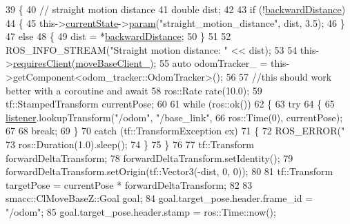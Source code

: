 \begin{DoxyCode}
39     \{
40         \textcolor{comment}{// straight motion distance}
41         \textcolor{keywordtype}{double} dist;
42 
43         \textcolor{keywordflow}{if} (!\hyperlink{classsm__dance__bot_1_1CbNavigateBackwards_ad5b1a7d85676aefa31f966baf61b6378}{backwardDistance})
44         \{
45             this->\hyperlink{classsmacc_1_1SmaccClientBehavior_af76fc9b877542ed5caf033f820c107d0}{currentState}->\hyperlink{classsmacc_1_1ISmaccState_a4982f2187ed6da337462721146e8ef70}{param}(\textcolor{stringliteral}{"straight\_motion\_distance"}, dist, 3.5);
46         \}
47         \textcolor{keywordflow}{else}
48         \{
49             dist = *\hyperlink{classsm__dance__bot_1_1CbNavigateBackwards_ad5b1a7d85676aefa31f966baf61b6378}{backwardDistance};
50         \}
51 
52         ROS\_INFO\_STREAM(\textcolor{stringliteral}{"Straight motion distance: "} << dist);
53 
54         this->\hyperlink{classsmacc_1_1SmaccClientBehavior_a917f001e763a1059af337bf4e164f542}{requiresClient}(\hyperlink{classsm__dance__bot_1_1CbNavigateBackwards_a8dea4225f55f14bf0a941baae383b07f}{moveBaseClient\_});
55         \textcolor{keyword}{auto} odomTracker\_ = this->getComponent<odom\_tracker::OdomTracker>();
56         
57         \textcolor{comment}{//this should work better with a coroutine and await}
58         ros::Rate rate(10.0);
59         tf::StampedTransform currentPose;
60 
61         \textcolor{keywordflow}{while} (ros::ok())
62         \{
63             \textcolor{keywordflow}{try}
64             \{
65                 \hyperlink{classsm__dance__bot_1_1CbNavigateBackwards_a4ec9af0d5b94c5e0654a768c36bec85b}{listener}.lookupTransform(\textcolor{stringliteral}{"/odom"}, \textcolor{stringliteral}{"/base\_link"},
66                                          ros::Time(0), currentPose);
67 
68                 \textcolor{keywordflow}{break};
69             \}
70             \textcolor{keywordflow}{catch} (tf::TransformException ex)
71             \{
72                 ROS\_ERROR(\textcolor{stringliteral}{"%
73                 ros::Duration(1.0).sleep();
74             \}
75         \}
76 
77         tf::Transform forwardDeltaTransform;
78         forwardDeltaTransform.setIdentity();
79         forwardDeltaTransform.setOrigin(tf::Vector3(-dist, 0, 0));
80 
81         tf::Transform targetPose = currentPose * forwardDeltaTransform;
82 
83         smacc::ClMoveBaseZ::Goal goal;
84         goal.target\_pose.header.frame\_id = \textcolor{stringliteral}{"/odom"};
85         goal.target\_pose.header.stamp = ros::Time::now();
}
\end{DoxyCode}
